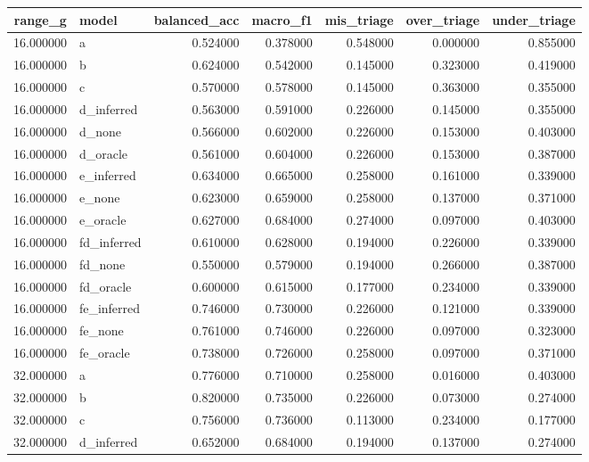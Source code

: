 \begin{tabular}{rlrrrrr}
\toprule
range\_g & model & balanced\_acc & macro\_f1 & mis\_triage & over\_triage & under\_triage \\
\midrule
16.000000 & a & 0.524000 & 0.378000 & 0.548000 & 0.000000 & 0.855000 \\
16.000000 & b & 0.624000 & 0.542000 & 0.145000 & 0.323000 & 0.419000 \\
16.000000 & c & 0.570000 & 0.578000 & 0.145000 & 0.363000 & 0.355000 \\
16.000000 & d\_inferred & 0.563000 & 0.591000 & 0.226000 & 0.145000 & 0.355000 \\
16.000000 & d\_none & 0.566000 & 0.602000 & 0.226000 & 0.153000 & 0.403000 \\
16.000000 & d\_oracle & 0.561000 & 0.604000 & 0.226000 & 0.153000 & 0.387000 \\
16.000000 & e\_inferred & 0.634000 & 0.665000 & 0.258000 & 0.161000 & 0.339000 \\
16.000000 & e\_none & 0.623000 & 0.659000 & 0.258000 & 0.137000 & 0.371000 \\
16.000000 & e\_oracle & 0.627000 & 0.684000 & 0.274000 & 0.097000 & 0.403000 \\
16.000000 & fd\_inferred & 0.610000 & 0.628000 & 0.194000 & 0.226000 & 0.339000 \\
16.000000 & fd\_none & 0.550000 & 0.579000 & 0.194000 & 0.266000 & 0.387000 \\
16.000000 & fd\_oracle & 0.600000 & 0.615000 & 0.177000 & 0.234000 & 0.339000 \\
16.000000 & fe\_inferred & 0.746000 & 0.730000 & 0.226000 & 0.121000 & 0.339000 \\
16.000000 & fe\_none & 0.761000 & 0.746000 & 0.226000 & 0.097000 & 0.323000 \\
16.000000 & fe\_oracle & 0.738000 & 0.726000 & 0.258000 & 0.097000 & 0.371000 \\
32.000000 & a & 0.776000 & 0.710000 & 0.258000 & 0.016000 & 0.403000 \\
32.000000 & b & 0.820000 & 0.735000 & 0.226000 & 0.073000 & 0.274000 \\
32.000000 & c & 0.756000 & 0.736000 & 0.113000 & 0.234000 & 0.177000 \\
32.000000 & d\_inferred & 0.652000 & 0.684000 & 0.194000 & 0.137000 & 0.274000 \\

\end{tabular}
